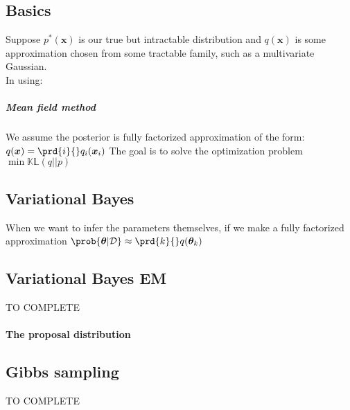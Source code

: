 \subsection{Basics}
Suppose $p^{*}\left(\bm{x}\right)$ is our true but intractable distribution and $q(\bm{x})$
is some approximation chosen from some tractable family, such as a multivariate Gaussian.\\
In using:
\begin{center}
\end{center}

\subparagraph{Mean field method}
We assume the posterior is fully factorized approximation of the form:
$q(\bm{x}) = \prd{i}{}q_{i}(\bm{x}_{i})$
The goal is to solve the optimization problem $\displaystyle\min \mathbb{KL}(q||p)$

\subsection{Variational Bayes}
When we want to infer the parameters themselves, if we make a fully factorized approximation
$\prob{\bm{\theta}|\mathcal{D}}\approx\prd{k}{}q(\bm{\theta}_{k})$

\subsection{Variational Bayes EM}
TO COMPLETE
\paragraph{The proposal distribution}

\subsection{Gibbs sampling}
TO COMPLETE
